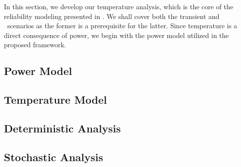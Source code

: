 In this section, we develop our temperature analysis, which is the core of the reliability modeling presented in .
We shall cover both the transient and \dss\ scenarios as the former is a prerequisite for the latter.
Since temperature is a direct consequence of power, we begin with the power model utilized in the proposed framework.

\subsection{Power Model} 


\subsection{Temperature Model} 


\subsection{Deterministic Analysis} 


\subsection{Stochastic Analysis} 

